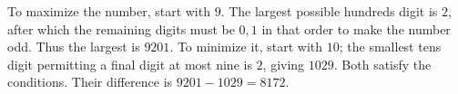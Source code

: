 To maximize the number, start with $9$. The largest possible hundreds digit is $2$, after which the remaining digits must be $0,1$ in that order to make the number odd. Thus the largest is $9201$. To minimize it, start with $10$; the smallest tens digit permitting a final digit at most nine is $2$, giving $1029$. Both satisfy the conditions. Their difference is $\boxed{9201-1029=8172}$.
